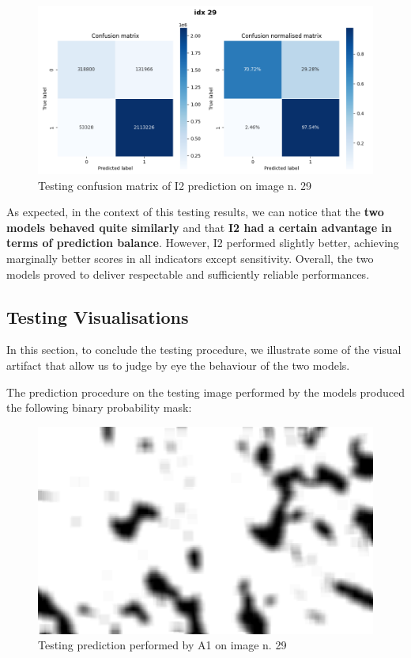 \begin{figure}[H]
 \centering
 \includegraphics[scale=0.6, cframe=bluepoli 2pt]{./resources/I2_conf_matr_29.png}
 \caption[I2 test confusion matrix]
    {Testing confusion matrix of I2 prediction on image n. 29}
\end{figure}

As expected, in the context of this testing results, we can notice that the \textbf{two models behaved quite similarly} and that \textbf{I2 had a certain advantage in terms of prediction balance}. However, I2 performed slightly better, achieving marginally better scores in all indicators except sensitivity. Overall, the two models proved to deliver respectable and sufficiently reliable performances.

\subsection{Testing Visualisations}

\par
In this section, to conclude the testing procedure, we illustrate some of the visual artifact that allow us to judge by eye the behaviour of the two models.

\par
The prediction procedure on the testing image performed by the models produced the following binary probability mask:

\begin{figure}[H]
 \centering
 \includegraphics[scale=0.2, cframe=bluepoli 2pt]{./resources/A1_avg_29.png}
 \caption[A1 test prediction]
    {Testing prediction performed by A1 on image n. 29}
\end{figure}

